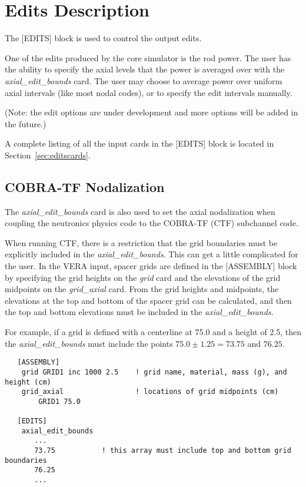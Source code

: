\section{Edits Description}

The [EDITS] block is used to control the output edits.

One of the edits produced by the core simulator is the rod power.   The user has 
the ability to specify the axial levels that the power is averaged over with 
the {\it axial\_edit\_bounds} card.
The user may choose to average power over uniform axial intervals (like most nodal codes),
or to specify the edit intervals manually.

(Note: the edit options are under development and more options will be added in the future.)

A complete listing of all the input cards in the [EDITS] block is located in Section~\ref{sec:editscards}.

\subsection{COBRA-TF Nodalization}

The {\it axial\_edit\_bounds} card is also used to set the axial nodalization when coupling
the neutronics physics code to the COBRA-TF (CTF) subchannel code.

When running CTF, there is a restriction that the grid boundaries must be explicitly
included in the {\it axial\_edit\_bounds}. This can get a little complicated for the user.
In the VERA input, spacer grids are defined in the [ASSEMBLY] block by specifying the 
grid heights on the {\it grid} card and the elevations of the grid midpoints 
on the {\it grid\_axial} card.
From the grid heights and midpoints, the elevations at the top and bottom of the spacer grid
can be calculated, and then the top and bottom elevations must be included 
in the {\it axial\_edit\_bounds}.

For example, if a grid is defined with a centerline at 75.0 and a height of 2.5, then the
{\it axial\_edit\_bounds} must include the points $75.0 \pm 1.25 = 73.75$ and $76.25$.

\begin{verbatim}
   [ASSEMBLY]
    grid GRID1 inc 1000 2.5    ! grid name, material, mass (g), and height (cm)
    grid_axial                 ! locations of grid midpoints (cm)
        GRID1 75.0

   [EDITS]
    axial_edit_bounds
       ...
       73.75           ! this array must include top and bottom grid boundaries
       76.25
       ...
\end{verbatim}

